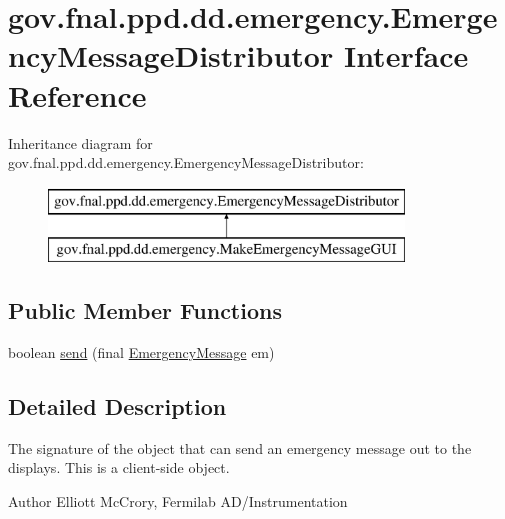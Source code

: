 \hypertarget{interfacegov_1_1fnal_1_1ppd_1_1dd_1_1emergency_1_1EmergencyMessageDistributor}{\section{gov.\-fnal.\-ppd.\-dd.\-emergency.\-Emergency\-Message\-Distributor Interface Reference}
\label{interfacegov_1_1fnal_1_1ppd_1_1dd_1_1emergency_1_1EmergencyMessageDistributor}
}
Inheritance diagram for gov.\-fnal.\-ppd.\-dd.\-emergency.\-Emergency\-Message\-Distributor\-:\begin{figure}[H]
\begin{center}
\leavevmode
\includegraphics[height=2.000000cm]{interfacegov_1_1fnal_1_1ppd_1_1dd_1_1emergency_1_1EmergencyMessageDistributor}
\end{center}
\end{figure}
\subsection*{Public Member Functions}
\begin{DoxyCompactItemize}
\item 
boolean \hyperlink{interfacegov_1_1fnal_1_1ppd_1_1dd_1_1emergency_1_1EmergencyMessageDistributor_aa67e1816eaa0182a8329bce2c1cd6a7a}{send} (final \hyperlink{classgov_1_1fnal_1_1ppd_1_1dd_1_1emergency_1_1EmergencyMessage}{Emergency\-Message} em)
\end{DoxyCompactItemize}


\subsection{Detailed Description}
The signature of the object that can send an emergency message out to the displays. This is a client-\/side object.

\begin{DoxyAuthor}{Author}
Elliott Mc\-Crory, Fermilab A\-D/\-Instrumentation 
\end{DoxyAuthor}


